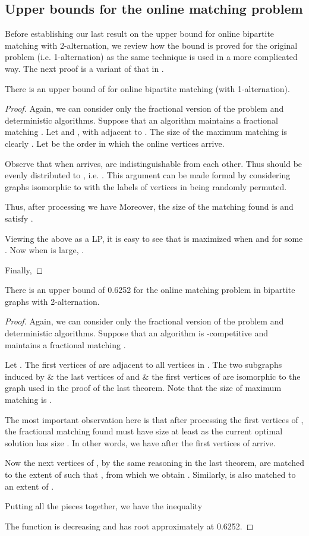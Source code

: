 \documentclass{article}
\begin{document}
\subsection{Upper bounds for the online matching problem}
Before establishing our last result on the upper bound for online bipartite matching with 2-alternation, we review how the bound  is proved for the original problem (i.e. 1-alternation) as the same technique is used in a more complicated way. The next proof is a variant of that in \cite{Karp1990}.
\begin{proposition}
There is an upper bound of  for online bipartite matching (with 1-alternation).
\end{proposition}
\begin{proof}
Again, we can consider only the fractional version of the problem and deterministic algorithms. Suppose that an algorithm maintains a fractional matching . Let  and , with  adjacent to . The size of the maximum matching is clearly . Let  be the order in which the online vertices arrive.

Observe that when  arrives,  are indistinguishable from each other. Thus  should be evenly distributed to , i.e. . This argument can be made formal by considering graphs isomorphic to  with the labels of vertices in  being randomly permuted.

Thus, after processing  we have  Moreover, the size of the matching found is  and  satisfy .

Viewing the above as a LP, it is easy to see that  is maximized when  and  for some . Now when  is large, .

Finally, 
\end{proof}

\begin{proposition}
There is an upper bound of 0.6252 for the online matching problem in bipartite graphs with 2-alternation.
\end{proposition}
\begin{proof}
Again, we can consider only the fractional version of the problem and deterministic algorithms. Suppose that an algorithm is -competitive and maintains a fractional matching .

Let . The first  vertices of  are adjacent to all vertices in . The two subgraphs induced by  \& the last  vertices of  and  \& the first  vertices of  are isomorphic to the graph used in the proof of the last theorem. Note that the size of maximum matching is .

The most important observation here is that after processing the first  vertices of , the fractional matching found must have size at least  as the current optimal solution has size . In other words, we have after the first  vertices of  arrive.

Now the next  vertices of , by the same reasoning in the last theorem, are matched to the extent of  such that , from which we obtain . Similarly,  is also matched to an extent of .

Putting all the pieces together, we have the inequality 

The function  is decreasing and has root approximately at 0.6252.
\end{proof}
\end{document}
